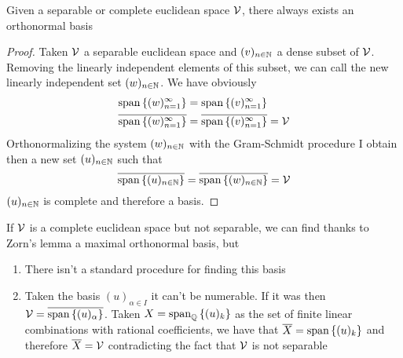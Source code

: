 \documentclass[../complete.tex]{subfiles}
\begin{document}
\begin{thm}
	Given a separable or complete euclidean space $\mathcal{V}$, there always exists an orthonormal basis
\end{thm}
\begin{proof}
	Taken $\mathcal{V}$ a separable euclidean space and $(v)_{n\in\mathbb{N}}$ a dense subset of $\mathcal{V}$.\\
	Removing the linearly independent elements of this subset, we can call the new linearly independent set $(w)_{n\in\mathbb{N}}$. We have obviously
	\begin{equation*}
		\begin{aligned}
			\mathrm{span}\left\{ (w)_{n=1}^\infty \right\}&=\mathrm{span}\left\{ (v)_{n=1}^\infty \right\}\\
			\overline{\mathrm{span}\left\{ (w)_{n=1}^\infty \right\}}&=\overline{\mathrm{span}\left\{ (v)_{n=1}^\infty \right\}}=\mathcal{V}
		\end{aligned}
	\end{equation*}
	Orthonormalizing the system $(w)_{n\in\mathbb{N}}$ with the Gram-Schmidt procedure I obtain then a new set $(u)_{n\in\mathbb{N}}$ such that
	\begin{equation*}
		\overline{\mathrm{span}\left\{ (u)_{n\in\mathbb{N}} \right\}}=\overline{\mathrm{span}\left\{ (w)_{n\in\mathbb{N}} \right\}}=\mathcal{V}
	\end{equation*}
	$(u)_{n\in\mathbb{N}}$ is complete and therefore a basis.
\end{proof}
\begin{rmk}
	If $\mathcal{V}$ is a complete euclidean space but not separable, we can find thanks to Zorn's lemma a maximal orthonormal basis, but
	\begin{enumerate}
	\item There isn't a standard procedure for finding this basis
	\item Taken the basis $(u)_{\alpha\in I}$ it can't be numerable. If it was then $\mathcal{V}=\overline{\mathrm{span}\left\{ (u)_{\alpha} \right\}}$. Taken $X=\mathrm{span}_{\mathbb{Q}}\left\{ (u)_k \right\}$ as the set of finite linear combinations with rational coefficients, we have that $\overline{X}=\mathrm{span}\left\{ (u)_k \right\}$ and therefore $\overline{X}=\mathcal{V}$ contradicting the fact that $\mathcal{V}$ is not separable
	\end{enumerate}
\end{rmk}
\end{document}
